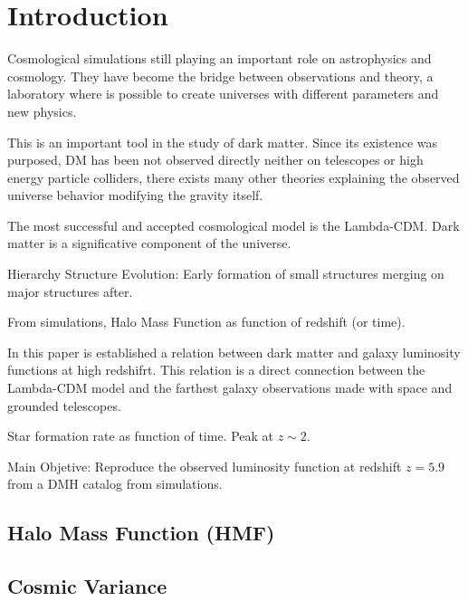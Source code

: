 \section{Introduction}
Cosmological simulations still playing an important role on astrophysics and
cosmology. They have become the bridge between observations and theory, a
laboratory where is possible to create universes with different parameters and
new physics.

This is an important tool in the study of dark matter. Since its existence was
purposed, DM has been not observed directly neither on telescopes or high energy
particle colliders, there exists many other theories explaining the observed
universe behavior modifying the gravity itself.

The most successful and accepted cosmological model is the Lambda-CDM. 
Dark matter is a significative component of the universe.
\citep{trimble87}

Hierarchy Structure Evolution: Early formation of small structures
merging on major structures after.

From simulations, Halo Mass Function as function of redshift (or time).


In this paper is established a relation between dark matter and galaxy
luminosity functions at high redshifrt. This relation is a direct
connection between the Lambda-CDM model and the farthest galaxy observations
made with space and grounded telescopes.


Star formation rate as function of time. Peak at $z\sim 2$.

Main Objetive: Reproduce the observed luminosity function at redshift $z=5.9$
from a DMH catalog from simulations. 

  \subsection{Halo Mass Function (HMF)}


  
  
  
  \subsection{Cosmic Variance}
  

